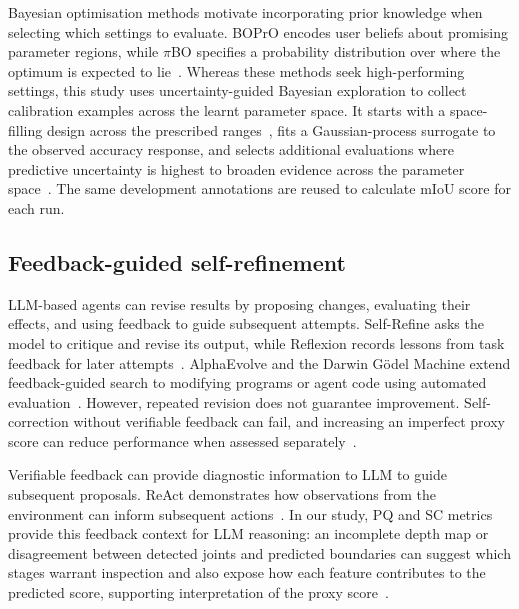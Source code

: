\documentclass[a4paper,fleqn]{cas-dc}
\begin{document}
Bayesian optimisation methods motivate incorporating prior knowledge when selecting which settings to evaluate. BOPrO encodes user beliefs about promising parameter regions, while $\pi$BO specifies a probability distribution over where the optimum is expected to lie~\cite{souza2020prior,hvarfner2022pibo}. Whereas these methods seek high-performing settings, this study uses uncertainty-guided Bayesian exploration to collect calibration examples across the learnt parameter space. It starts with a space-filling design across the prescribed ranges~\cite{joe2008constructing}, fits a Gaussian-process surrogate to the observed accuracy response, and selects additional evaluations where predictive uncertainty is highest to broaden evidence across the parameter space~\cite{gramacy2009adaptive,gramacy2020surrogates}. The same development annotations are reused to calculate mIoU score for each run.

\subsection{Feedback-guided self-refinement}

LLM-based agents can revise results by proposing changes, evaluating their effects, and using feedback to guide subsequent attempts. Self-Refine asks the model to critique and revise its output, while Reflexion records lessons from task feedback for later attempts~\cite{madaan2023selfrefine,shinn2023reflexion}. AlphaEvolve and the Darwin G\"odel Machine extend feedback-guided search to modifying programs or agent code using automated evaluation~\cite{novikov2025alphaevolve,zhang2025darwin}. However, repeated revision does not guarantee improvement. Self-correction without verifiable feedback can fail, and increasing an imperfect proxy score can reduce performance when assessed separately~\cite{huang2024selfcorrect,gao2023overoptimization}.

Verifiable feedback can provide diagnostic information to LLM to guide subsequent proposals. ReAct demonstrates how observations from the environment can inform subsequent actions~\cite{yao2023react}. In our study, PQ and SC metrics provide this feedback context for LLM reasoning: an incomplete depth map or disagreement between detected joints and predicted boundaries can suggest which stages warrant inspection
and also expose how each feature contributes to the predicted score, supporting interpretation of the proxy score~\cite{rudin2019stop}. 

\end{document}
